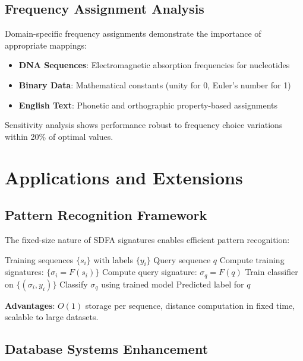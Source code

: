 \documentclass[10pt,journal,compsoc]{IEEEtran}
\newcommand{\sdfa}{\textsc{SDFA}}
\begin{document}
\subsection{Frequency Assignment Analysis}

Domain-specific frequency assignments demonstrate the importance of appropriate mappings:

\begin{itemize}
    \item \textbf{DNA Sequences}: Electromagnetic absorption frequencies for nucleotides
    \item \textbf{Binary Data}: Mathematical constants (unity for 0, Euler's number for 1)
    \item \textbf{English Text}: Phonetic and orthographic property-based assignments
\end{itemize}

Sensitivity analysis shows performance robust to frequency choice variations within 20\% of optimal values.

\section{Applications and Extensions}

\subsection{Pattern Recognition Framework}

The fixed-size nature of \sdfa{} signatures enables efficient pattern recognition:

\begin{algorithm}[t]
\caption{\sdfa{} Pattern Classification}
\begin{algorithmic}[1]
\REQUIRE Training sequences $\{s_i\}$ with labels $\{y_i\}$
\REQUIRE Query sequence $q$
\STATE Compute training signatures: $\{\sigma_i = F(s_i)\}$
\STATE Compute query signature: $\sigma_q = F(q)$
\STATE Train classifier on $\{(\sigma_i, y_i)\}$
\STATE Classify $\sigma_q$ using trained model
\RETURN Predicted label for $q$
\end{algorithmic}
\end{algorithm}

\textbf{Advantages}: $O(1)$ storage per sequence, distance computation in fixed time, scalable to large datasets.

\subsection{Database Systems Enhancement}
\end{document}
